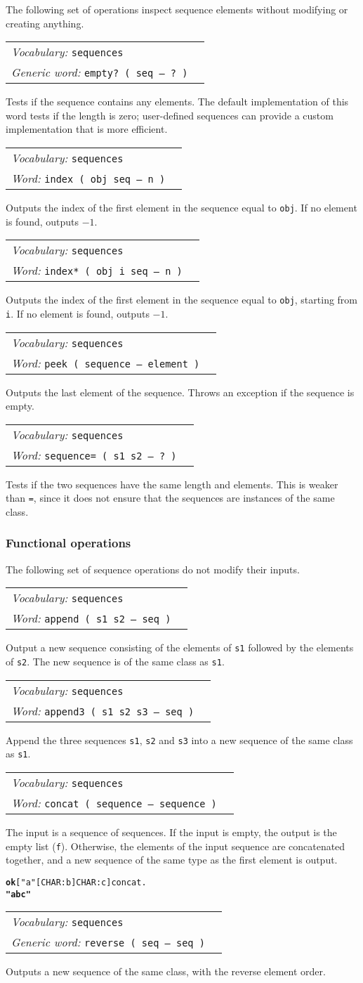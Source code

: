 \documentclass{book}
\newcommand{\tto}{\symbol{123}}
\newcommand{\ttc}{\symbol{125}}
\newcommand{\vocabulary}[1]{\emph{Vocabulary:} \texttt{#1}&\\}
\newcommand{\ordinaryword}[2]{\index{\texttt{#1}}\emph{Word:} \texttt{#2}&\\}
\newcommand{\genericword}[2]{\index{\texttt{#1}}\emph{Generic word:} \texttt{#2}&\\}
\newcommand{\wordtable}[1]{

\begin{tabularx}{12cm}[t]{lX}
\hline
#1
\hline
\end{tabularx}

}
\begin{document}
The following set of operations inspect sequence elements without modifying or creating anything.

\wordtable{
\vocabulary{sequences}
\genericword{empty?}{empty?~( seq -- ?~)}
}
Tests if the sequence contains any elements. The default implementation of this word tests if the length is zero; user-defined sequences can provide a custom implementation that is more efficient.
\wordtable{
\vocabulary{sequences}
\ordinaryword{index}{index ( obj seq -- n )}
}
Outputs the index of the first element in the sequence equal to \texttt{obj}. If no element is found, outputs $-1$.
\wordtable{
\vocabulary{sequences}
\ordinaryword{index*}{index* ( obj i seq -- n )}
}
Outputs the index of the first element in the sequence equal to \texttt{obj}, starting from \texttt{i}. If no element is found, outputs $-1$.
\wordtable{
\vocabulary{sequences}
\ordinaryword{peek}{peek ( sequence -- element )}
}
Outputs the last element of the sequence. Throws an exception if the sequence is empty.
\wordtable{
\vocabulary{sequences}
\ordinaryword{sequence=}{sequence= ( s1 s2 -- ?~)}

}
Tests if the two sequences have the same length and elements. This is weaker than \texttt{=}, since it does not ensure that the sequences are instances of the same class.

\subsubsection{Functional operations}

The following set of sequence operations do not modify their inputs.

\wordtable{
\vocabulary{sequences}
\ordinaryword{append}{append ( s1 s2 -- seq )}
}
Output a new sequence consisting of the elements of \texttt{s1} followed by the elements of \texttt{s2}. The new sequence is of the same class as \texttt{s1}.
\wordtable{
\vocabulary{sequences}
\ordinaryword{append3}{append3 ( s1 s2 s3 -- seq )}
}
Append the three sequences \texttt{s1}, \texttt{s2} and \texttt{s3} into a new sequence of the same class as \texttt{s1}.
\wordtable{
\vocabulary{sequences}
\ordinaryword{concat}{concat ( sequence -- sequence )}
}
The input is a sequence of sequences. If the input is empty, the output is the empty list (\texttt{f}). Otherwise, the elements of the input sequence are concatenated together, and a new sequence of the same type as the first element is output.
\begin{alltt}
\textbf{ok} [ "a" [ CHAR: b ] \tto CHAR: c \ttc ] concat .
\textbf{"abc"}
\end{alltt}
\wordtable{
\vocabulary{sequences}
\genericword{reverse}{reverse ( seq -- seq )}
}
Outputs a new sequence of the same class, with the reverse element order.
\end{document}
